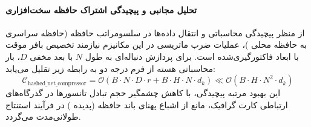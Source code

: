 \paragraph{تحلیل مجانبی و پیچیدگی اشتراک حافظه سخت‌افزاری}
از منظر پیچیدگی محاسباتی و انتقال داده‌ها در سلسومراتب حافظه (حافظه سراسری  به حافظه محلی )، عملیات ضرب ماتریسی در این مکانیزم نیازمند تخصیص بافر موقت با ابعاد فاکتورگیری‌شده است. برای پردازش دنباله‌ای به طول $N$ با بعد مخفی $D$، بار محاسباتی هسته از فرم درجه دو به رابطه زیر تقلیل می‌یابد:
\begin{equation}
\label{eq:complexity_hashed_net_compressor}
\mathcal{C}_{\text{hashed\_net\_compressor}} = \mathcal{O}\left( B \cdot N \cdot D \cdot r + B \cdot H \cdot N \cdot d_k \right) \ll \mathcal{O}\left( B \cdot H \cdot N^2 \cdot d_k \right)
\end{equation}
این بهبود مرتبه پیچیدگی، با کاهش چشمگیر حجم تبادل تانسورها در گذرگاه‌های ارتباطی کارت گرافیک، مانع از اشباع پهنای باند حافظه (پدیده ) در فرآیند استنتاج طولانی‌مدت می‌گردد.
